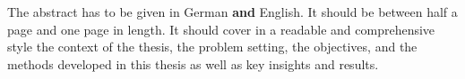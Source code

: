 

The abstract has to be given in German \textbf{and} English. It should
be between half a page and one page in length. It should cover in a
readable and comprehensive style the context of the thesis, the
problem setting, the objectives, and the methods developed in this
thesis as well as key insights and results.
